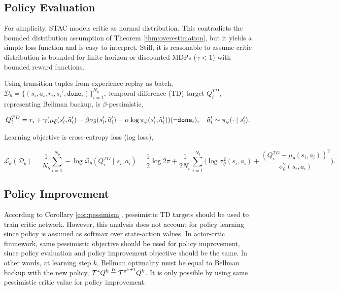 \documentclass{article}
\newcommand\disteq{\mathrel{\stackrel{\makebox[0pt]{\mbox{\normalfont\tiny D}}}{=}}}
\begin{document}
\subsection{Policy Evaluation}

For simplicity, STAC models critic as normal distribution. This contradicts the bounded distribution assumption of Theorem \ref{thm:overestimation}, but it yields a simple loss function and is easy to interpret. Still, it is reasonable to assume critic distribution is bounded for finite horizon or discounted MDPs ($\gamma<1$) with bounded reward functions. %

Using transition tuples from experience replay as batch, $\mathcal{D}_b = \{(s_i, a_i, r_i, s_i', \texttt{done}_i)\}_{i=1}^{N_b}$, temporal difference (TD) target $Q_i^{TD}$, representing Bellman backup, is $\beta$-pessimistic, 

\begin{equation}
	\label{eqn:td_target}
	Q_i^{TD} = r_i + \gamma (\mu_{\bar{\theta}}(s_i', \Tilde{a}_{i}') - \beta \sigma_{\bar{\theta}}(s_i', \Tilde{a}_{i}') - \alpha \log \pi_{\phi}(s_i', \Tilde{a}_{i}')) (\neg\texttt{done}_i), \quad \Tilde{a}_{i}'\sim\pi_{\phi}(\cdot \mid s_i'). 
\end{equation}

Learning objective is cross-entropy loss (log loss), 

\begin{equation}
	\mathcal{L}_{\theta}(\mathcal{D}_b) = \frac{1}{N_{b}} \sum_{i=1}^{N_b}  - \log{\mathcal{Q}_{\theta} (Q_i^{TD} \mid s_i,a_i)} = \frac{1}{2} \log{2\pi} + \frac{1}{2 N_{b}} \sum_{i=1}^{N_b}  \Big( \log{\sigma^2_{\theta}(s_i,a_i)} + \frac{(Q_i^{TD} - \mu_{\theta} (s_i,a_i))^2}{\sigma^2_{\theta}(s_i,a_i)} \Big). 
\end{equation}

\subsection{Policy Improvement}

According to Corollary \ref{cor:pessimism}, pessimistic TD targets should be used to train critic network. However, this analysis does not account for policy learning since policy is assumed as $\text{softmax}$ over state-action values. In actor-crtic framework, same pessimistic objective should be used for policy improvement, since policy evaluation and policy improvement objective should be the same. In other words, at learning step $k$, Bellman optimality must be equal to Bellman backup with the new policy, $\mathcal{T}^* Q^k \disteq \mathcal{T}^{\pi^{k+1}} Q^k$. It is only possible by using same pessimistic critic value for policy improvement. 
\end{document}
